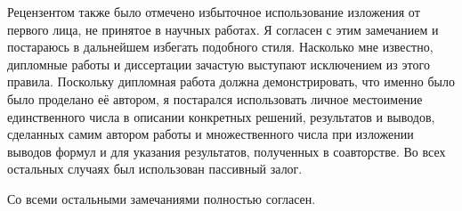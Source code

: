 \documentclass{trlnotes}
\begin{document}
Рецензентом также было отмечено избыточное использование изложения от первого лица, не принятое в научных работах.
Я согласен с этим замечанием и постараюсь в дальнейшем избегать подобного стиля. 
Насколько мне известно, дипломные работы и диссертации зачастую выступают исключением из этого правила.
Поскольку дипломная работа должна демонстрировать, что именно было было проделано её автором, 
я постарался использовать личное местоимение единственного числа в описании конкретных решений, 
результатов и выводов, сделанных самим автором работы и множественного числа при
изложении выводов формул и для указания результатов, полученных в соавторстве. 
Во всех остальных случаях был использован пассивный залог.

Со всеми остальными замечаниями полностью согласен.
\end{document}
